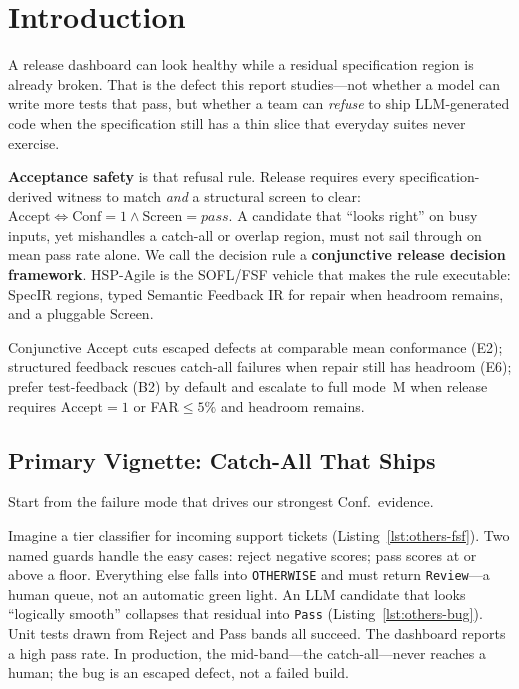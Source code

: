 \chapter{Introduction}
\label{ch:intro}

A release dashboard can look healthy while a residual specification region is
already broken.
That is the defect this report studies---not whether a model can write more
tests that pass, but whether a team can \emph{refuse} to ship LLM-generated
code when the specification still has a thin slice that everyday suites never
exercise.

\textbf{Acceptance safety} is that refusal rule.
Release requires every specification-derived witness to match \emph{and} a
structural screen to clear:
$\mathrm{Accept}\Leftrightarrow\mathrm{Conf}{=}1\wedge\mathrm{Screen}{=}\mathit{pass}$.
A candidate that ``looks right'' on busy inputs, yet mishandles a catch-all or
overlap region, must not sail through on mean pass rate alone.
We call the decision rule a \textbf{conjunctive release decision framework}.
HSP-Agile is the SOFL/FSF vehicle that makes the rule executable: SpecIR
regions, typed Semantic Feedback IR for repair when headroom remains, and a
pluggable $\mathrm{Screen}$.

Conjunctive Accept cuts escaped defects at comparable mean conformance (E2);
structured feedback rescues catch-all failures when repair still has headroom
(E6); prefer test-feedback (B2) by default and escalate to full mode~M when
release requires $\mathrm{Accept}{=}1$ or FAR${\le}5\%$ and headroom remains.


\section{Primary Vignette: Catch-All That Ships}
\label{sec:intro:running-example}

Start from the failure mode that drives our strongest Conf.\ evidence.

Imagine a tier classifier for incoming support tickets
(Listing~\ref{lst:others-fsf}).
Two named guards handle the easy cases: reject negative scores; pass scores at
or above a floor.
Everything else falls into \texttt{OTHERWISE} and must return
\texttt{Review}---a human queue, not an automatic green light.
An LLM candidate that looks ``logically smooth'' collapses that residual into
\texttt{Pass} (Listing~\ref{lst:others-bug}).
Unit tests drawn from Reject and Pass bands all succeed.
The dashboard reports a high pass rate.
In production, the mid-band---the catch-all---never reaches a human; the bug
is an escaped defect, not a failed build.

